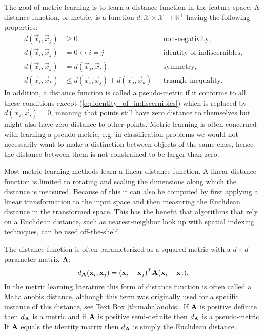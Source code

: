 The goal of metric learning is to learn a distance function in the feature space. A distance function, or metric, is a function $d: \mathcal{X} \times \mathcal{X} \rightarrow \mathbb{R}^{+}$ having the following properties:
\begin{subequations}
\begin{align}
        d(\vec{x}_i, \vec{x}_j) & \geq 0 &  &\text{non-negativity}, \label{eq:non-negativity}\\
        d(\vec{x}_i, \vec{x}_j) & = 0 \leftrightarrow i = j & &\text{identity of indiscernibles}, \label{eq:identity_of_indiscernibles} \\
        d(\vec{x}_i, \vec{x}_j) & = d(\vec{x}_j, \vec{x}_i) &  &\text{symmetry}, \label{eq:symmetry}\\
        d(\vec{x}_i, \vec{x}_k) & \leq d(\vec{x}_i, \vec{x}_j) + d(\vec{x}_j, \vec{x}_k) &  &\text{triangle inequality}. \label{eq:triangle_unequality}
\end{align}
\end{subequations}
In addition, a distance function is called a pseudo-metric if it conforms to all these conditions except (\ref{eq:identity_of_indiscernibles}) which is replaced by $d(\vec{x}_i, \vec{x}_i) = 0$, meaning that points still have zero distance to themselves but might also have zero distance to other points. Metric learning is often concerned with learning a pseudo-metric, e.g. in classification problems we would not necessarily want to make a distinction between objects of the same class, hence the distance between them is not constrained to be larger than zero.

Most metric learning methods learn a linear distance function. A linear distance function is limited to rotating and scaling the dimensions along which the distance is measured. Because of this it can also be computed by first applying a linear transformation to the input space and then measuring the Euclidean distance in the transformed space. This has the benefit that algorithms that rely on a Euclidean distance, such as nearest-neighbor look up with spatial indexing techniques, can be used off-the-shelf.

The distance function is often parameterized as a squared metric with a $d \times d$ parameter matrix $\mathbf{A}$:
\begin{equation}
d_{\mathbf{A}}(\mathbf{x}_i, \mathbf{x}_j) = (\mathbf{x}_i - \mathbf{x}_j)^T\mathbf{A}(\mathbf{x}_i - \mathbf{x}_j).
\label{eq:linearmetric}
\end{equation}
In the metric learning literature this form of distance function is often called a Mahalanobis distance, although this term was originally used for a specific instance of this distance, see Text Box \ref{tb:mahalanobis}. If $\mathbf{A}$ is positive definite then $d_{\mathbf{A}}$ is a metric and if $\mathbf{A}$ is positive semi-definite then $d_{\mathbf{A}}$ is a pseudo-metric. If $\mathbf{A}$ equals the identity matrix then $d_{\mathbf{A}}$ is simply the Euclidean distance.

